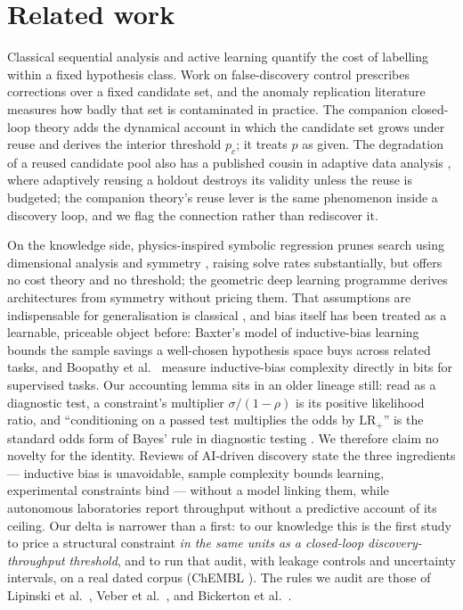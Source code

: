 \documentclass[11pt]{article}
\begin{document}
\section{Related work}

Classical sequential analysis \cite{wald} and active learning \cite{settles}
quantify the cost of labelling within a fixed hypothesis class. Work on
false-discovery control \cite{benjamini} prescribes corrections over a fixed
candidate set, and the anomaly replication literature \cite{hou} measures how
badly that set is contaminated in practice. The companion closed-loop theory
\cite{ghosh-throughput} adds the dynamical account in which the candidate set
grows under reuse and derives the interior threshold $p_c$; it treats $p$ as
given. The degradation of a reused candidate pool also has a published
cousin in adaptive data analysis \cite{dwork}, where adaptively reusing a
holdout destroys its validity unless the reuse is budgeted; the companion
theory's reuse lever is the same phenomenon inside a discovery loop, and we
flag the connection rather than rediscover it.

On the knowledge side, physics-inspired symbolic regression prunes search
using dimensional analysis and symmetry \cite{udrescu}, raising solve rates
substantially, but offers no cost theory and no threshold; the geometric deep
learning programme \cite{bronstein} derives architectures from symmetry
without pricing them. That assumptions are indispensable for generalisation
is classical \cite{mitchell, wolpert}, and bias itself has been treated as a
learnable, priceable object before: Baxter's model of inductive-bias
learning \cite{baxter} bounds the sample savings a well-chosen hypothesis
space buys across related tasks, and Boopathy et al.\ \cite{boopathy}
measure inductive-bias complexity directly in bits for supervised tasks. Our
accounting lemma sits in an older lineage still: read as a diagnostic test,
a constraint's multiplier $\sigma/(1-\rho)$ is its positive likelihood ratio,
and ``conditioning on a passed test multiplies the odds by $\mathrm{LR}_+$''
is the standard odds form of Bayes' rule in diagnostic testing
\cite{deeks}. We therefore claim no novelty for the identity. Reviews of
AI-driven discovery \cite{grosso} state the three ingredients --- inductive
bias is unavoidable, sample complexity bounds learning, experimental
constraints bind --- without a model linking them, while autonomous
laboratories \cite{king, szymanski} report throughput without a predictive
account of its ceiling. Our delta is narrower than a first: to our knowledge
this is the first study to price a structural constraint \emph{in the same
units as a closed-loop discovery-throughput threshold}, and to run that
audit, with leakage controls and uncertainty intervals, on a real dated
corpus (ChEMBL \cite{mendez}). The rules we audit are those of Lipinski et
al.\ \cite{lipinski}, Veber et al.\ \cite{veber}, and Bickerton et al.\
\cite{bickerton}.
\end{document}
